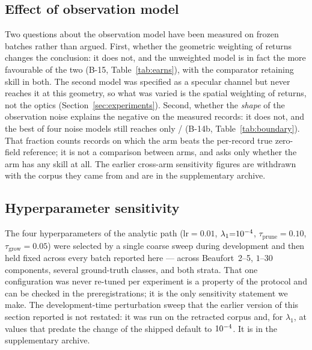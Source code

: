 \documentclass[review]{elsarticle}
\begin{document}
\subsection{Effect of observation model}

Two questions about the observation model have been measured on frozen batches
rather than argued. First, whether the geometric weighting of returns changes the
conclusion: it does not, and the unweighted model is in fact the more favourable of
the two (B-15, Table~\ref{tab:earns}), with the comparator retaining skill in both.
The second model was specified as a specular channel but never reaches it at this
geometry, so what was varied is the spatial weighting of returns, not the optics
(Section~\ref{sec:experiments}). Second, whether the \emph{shape} of the observation
noise explains the negative on the measured records: it does not, and the best of
four noise models still reaches only \BFourteenBBeats{}/\BFourteenBN{}
(B-14b, Table~\ref{tab:boundary}). That fraction counts records on which the arm
beats the per-record true zero-field reference; it is not a comparison between arms,
and asks only whether the arm has any skill at all. The earlier cross-arm sensitivity figures are
withdrawn with the corpus they came from and are in the supplementary archive.
\subsection{Hyperparameter sensitivity}
\label{sec:hyper}

The four hyperparameters of the analytic path ($\text{lr}{=}0.01$,
$\lambda_1{=}10^{-4}{}$, $\tau_{\text{prune}}{=}0.10$,
$\tau_{\text{grow}}{=}0.05$) were selected by a single coarse sweep during
development and then held fixed across every batch reported here --- across
Beaufort~2--5, $1$--$30$ components, several ground-truth classes, and both
strata. That one configuration was never re-tuned per experiment is a property of
the protocol and can be checked in the preregistrations; it is the only
sensitivity statement we make. The development-time perturbation sweep that the
earlier version of this section reported is not restated: it was run on the
retracted corpus and, for $\lambda_1$, at values that predate the change of the
shipped default to $10^{-4}{}$. It is in the supplementary archive.
\end{document}
